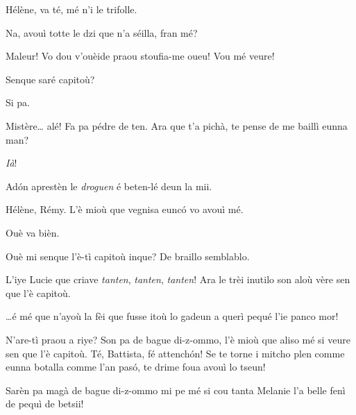 \begin{drama}
\Remyspeaks Hélène, va té, mé n'i le trifolle.

\Helenespeaks Na, avouì totte le dzi que n'a séilla, fran mé?

\Cesarspeaks{} Maleur! Vo dou v'ouèide praou stoufia-me oueu! Vou mé veure!


\Hermannspeaks{} Senque saré capitoù?

\Peterspeaks Si pa.

\Hermannspeaks Mistère\ldots {} alé! Fa pa pédre de ten. Ara que t'a pichà, te pense de me baillì eunna man?

\Peterspeaks \textit{Ià}!

\Hermannspeaks Ad\'on aprestèn le \textit{droguen} é beten-lé deun la mii.



\Cesarspeaks{} Hélène, Rémy. L'è mioù que vegnisa eunc\'o vo avouì mé.

\Remyspeaks Ouè va bièn.




\Germainespeaks Ouè mi senque l’è-tì capitoù inque? De braillo semblablo. 

\Hermannspeaks L'iye Lucie que criave \textit{tanten}, \textit{tanten}, \textit{tanten}! Ara le trèi inutilo son aloù vère sen que l'è capitoù.

\Battistaspeaks  \ldots é mé que n’ayoù la fèi que fusse itoù lo gadeun a querì pequé l’ie panco mor!


\Germainespeaks N’are-tì praou a riye? Son pa de bague di-z-ommo, l'è mioù que aliso mé si veure sen que l’è capitoù. Té, Battista, fé attench\'on! Se te torne i mitcho plen comme eunna botalla comme l'an pas\'o, te drime foua avouì lo tseun! 


\Battistaspeaks  Sarèn pa magà de bague di-z-ommo mi pe mé si cou tanta Melanie l’a belle fenì de pequì de betsii! 


\end{drama}
